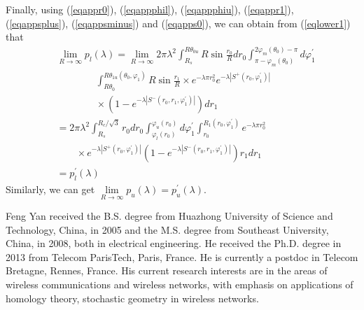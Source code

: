 \documentclass[journal, twoside]{IEEEtran}
\begin{document}
\begin{IEEEproof}
Finally, using (\ref{eqappr0}), (\ref{eqappphil}), (\ref{eqappphiu}), (\ref{eqappr1}), (\ref{eqappsplus}), (\ref{eqappsminus}) and (\ref{eqapps0}), we can obtain from (\ref{eqlower1}) that
	\begin{align*}
		& \lim_{R \to \infty} p_l(\lambda) = \lim_{R \to \infty} 2\pi\lambda^2 \int_{R_s}^{R\theta_{0u}} R\sin \frac{r_0}{R} dr_0 \int_{\pi - \varphi_m(\theta_0)}^{2\varphi_m(\theta_0) - \pi} d\varphi_1^\prime\\ 
		& \qquad \qquad \int_{R\theta_0}^{R\theta_{1u}(\theta_0, \varphi_1)} R\sin \frac{r_1}{R}
		  \times e^{-\lambda \pi r_0^2} e^{-\lambda |S^+(r_0, \varphi_1^\prime)|} \\
		& \qquad \qquad \times (1 - e^{-\lambda |S^-(r_0, r_1, \varphi_1^\prime)|})dr_1 \\
		& = 2\pi\lambda ^2 \int_{R_s}^{R_c/\sqrt{3}} r_0 dr_0 \int_{\varphi_l(r_0)}^{\varphi_u(r_0)} d\varphi_1^\prime \int_{r_0}^{R_1(r_0, \varphi_1^\prime)}   e^{-\lambda \pi r_0^2}\\
		& \qquad \times e^{-\lambda |S^+(r_0, \varphi_1^\prime)|} (1 - e^{-\lambda |S^-(r_0, r_1, \varphi_1^\prime)|})r_1 dr_1 \\
		& = p_l^\prime(\lambda)
	\end{align*}
	Similarly, we can get $\lim\limits_{R \to \infty} p_u(\lambda) = p_u^\prime(\lambda)$.

\end{IEEEproof}









\ifCLASSOPTIONcaptionsoff
  \newpage
\fi















\begin{IEEEbiography}{Feng Yan}
received the B.S. degree from Huazhong University of Science and 
Technology, China, in 2005 and the M.S. degree from Southeast 
University, China, in 2008, both in electrical engineering. He 
received the Ph.D. degree in 2013 from Telecom ParisTech, Paris, France. He
is currently a postdoc in Telecom Bretagne, Rennes, France. His 
current research interests are in the areas of wireless 
communications and wireless networks, with emphasis on applications 
of homology theory, stochastic geometry in wireless networks.
\end{IEEEbiography}
\end{document}

